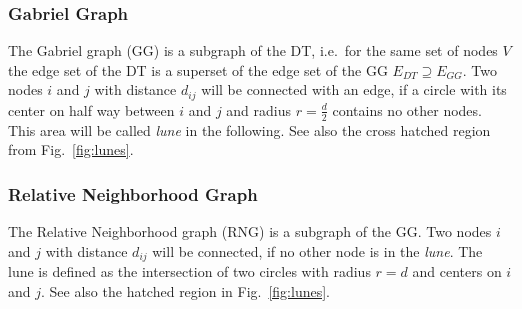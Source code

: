     \subsubsection{Gabriel Graph}
        The Gabriel graph (GG) \cite{Gabriel1969}
        is a subgraph of the DT, i.e.\ for the same set of nodes
        \(V\) the edge set of the DT is a superset of the edge set of the
        GG \(E_{DT} \supseteq E_{GG}\). Two nodes \(i\) and \(j\) with distance
        \(d_{ij}\) will be connected with an edge, if a circle with its
        center on half way between \(i\) and \(j\) and radius
        \(r = \frac d 2\) contains no other nodes. This area will be
        called \emph{lune} in the following. See also the cross hatched region
        from Fig.\ \ref{fig:lunes}.

    \subsubsection{Relative Neighborhood Graph}
        The Relative Neighborhood
        graph (RNG) \cite{Toussaint1980} is a subgraph of the GG. Two nodes \(i\) and \(j\) with
        distance \(d_{ij}\) will be connected, if no other node is in the
        \emph{lune}. The lune is defined as the intersection of two
        circles with radius \(r = d\) and centers on \(i\) and \(j\).
        See also the hatched region in Fig.\ \ref{fig:lunes}.

